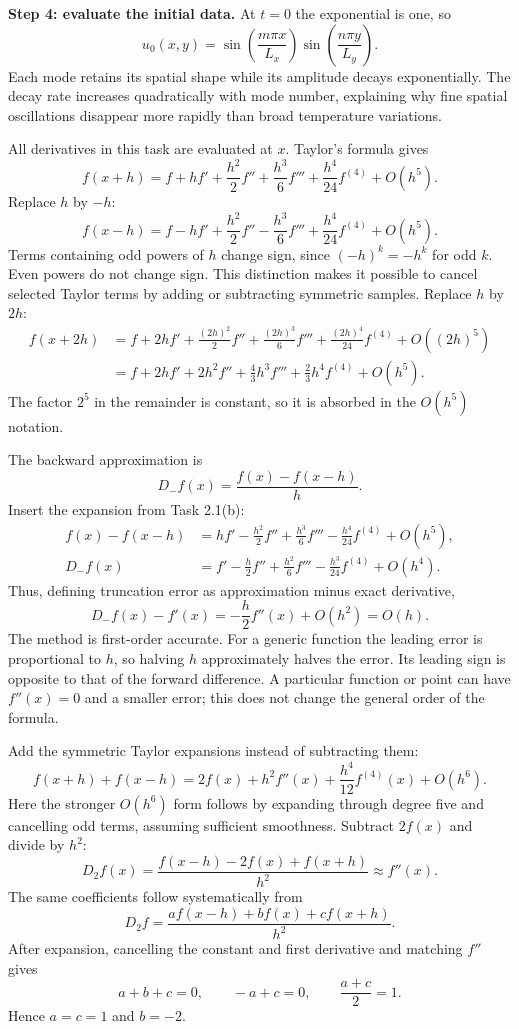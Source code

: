 \textbf{Step 4: evaluate the initial data.}
At $t=0$ the exponential is one, so
\[
\boxed{u_0(x,y)=\sin\!\left(\frac{m\pi x}{L_x}\right)
\sin\!\left(\frac{n\pi y}{L_y}\right).}
\]
Each mode retains its spatial shape while its amplitude decays exponentially. The decay rate
increases quadratically with mode number, explaining why fine spatial oscillations disappear
more rapidly than broad temperature variations.

All derivatives in this task are evaluated at $x$.
Taylor's formula gives
\[
\boxed{f(x+h)=f+hf'+\frac{h^2}{2}f''+\frac{h^3}{6}f'''
+\frac{h^4}{24}f^{(4)}+O(h^5).}
\]
Replace $h$ by $-h$:
\[
\boxed{f(x-h)=f-hf'+\frac{h^2}{2}f''-\frac{h^3}{6}f'''
+\frac{h^4}{24}f^{(4)}+O(h^5).}
\]
Terms containing odd powers of $h$ change sign, since $(-h)^k=-h^k$ for odd $k$.
Even powers do not change sign. This distinction makes it possible to cancel selected Taylor
terms by adding or subtracting symmetric samples.
Replace $h$ by $2h$:
\begin{align*}
f(x+2h)&=f+2hf'+\frac{(2h)^2}{2}f''+\frac{(2h)^3}{6}f'''
+\frac{(2h)^4}{24}f^{(4)}+O((2h)^5)\\
&=\boxed{f+2hf'+2h^2f''+\frac43h^3f'''+\frac23h^4f^{(4)}+O(h^5).}
\end{align*}
The factor $2^5$ in the remainder is constant, so it is absorbed in the $O(h^5)$ notation.

The backward approximation is
\[
D_-f(x)=\frac{f(x)-f(x-h)}{h}.
\]
Insert the expansion from Task 2.1(b):
\begin{align*}
f(x)-f(x-h)
&=hf'-\frac{h^2}{2}f''+\frac{h^3}{6}f'''-\frac{h^4}{24}f^{(4)}+O(h^5),\\
D_-f(x)&=f'-\frac{h}{2}f''+\frac{h^2}{6}f'''-\frac{h^3}{24}f^{(4)}+O(h^4).
\end{align*}
Thus, defining truncation error as approximation minus exact derivative,
\[
\boxed{D_-f(x)-f'(x)=-\frac{h}{2}f''(x)+O(h^2)=O(h).}
\]
The method is first-order accurate. For a generic function the leading error is proportional to
$h$, so halving $h$ approximately halves the error. Its leading sign is opposite to that of
the forward difference. A particular function or point can have $f''(x)=0$ and a smaller error;
this does not change the general order of the formula.

Add the symmetric Taylor expansions instead of subtracting them:
\[
f(x+h)+f(x-h)=2f(x)+h^2f''(x)+\frac{h^4}{12}f^{(4)}(x)+O(h^6).
\]
Here the stronger $O(h^6)$ form follows by expanding through degree five and cancelling odd
terms, assuming sufficient smoothness. Subtract $2f(x)$ and divide by $h^2$:
\[
\boxed{D_2f(x)=\frac{f(x-h)-2f(x)+f(x+h)}{h^2}\approx f''(x).}
\]
The same coefficients follow systematically from
\[
D_2f=\frac{af(x-h)+bf(x)+cf(x+h)}{h^2}.
\]
After expansion, cancelling the constant and first derivative and matching $f''$ gives
\[
a+b+c=0,\qquad -a+c=0,\qquad \frac{a+c}{2}=1.
\]
Hence $a=c=1$ and $b=-2$.

